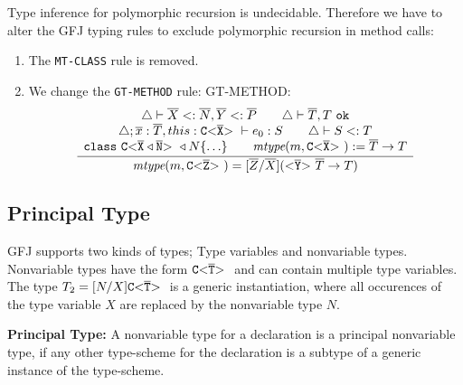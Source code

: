 \documentclass[acmsmall,screen,review]{acmart}
\begin{document}
Type inference for polymorphic recursion is undecidable.
Therefore we have to alter the GFJ typing rules to exclude polymorphic recursion in method calls:
\begin{enumerate}
    \item The \texttt{MT-CLASS} rule is removed.
    \item We change the \texttt{GT-METHOD} rule:
GT-METHOD:
\begin{align*}
\frac{\displaystyle \begin{array}{c}
\triangle \vdash \overline{X} <: \overline{N}, \overline{Y} <: \overline{P}  \quad \quad 
\triangle \vdash \overline{T}, T \ \texttt{ok} \\
\triangle ; \overline{x}:\overline{T}, this : \mathtt{C {\tt <} \overline{X} {\tt >} \ } \vdash e_0 : S \quad \quad
\triangle \vdash S <: T \\
\texttt{class}\ \mathtt{C {\tt <} \overline{X} \triangleleft \overline{N} {\tt >} \ } \triangleleft N \{ \ldots \} \quad \quad
\textit{mtype}(m, \mathtt{C {\tt <} \overline{X} {\tt >} \ }) := \overline{T} \to T \\
\end{array}}{\displaystyle 
\textit{mtype}(m, \mathtt{C {\tt <} \overline{Z} {\tt >} \ }) = [\overline{Z} / \overline{X}](\mathtt{ {\tt <} \overline{Y} {\tt >} \ } \overline{T} \to T)
}
\end{align*}
\end{enumerate}

\subsection{Principal Type}


GFJ supports two kinds of types;
Type variables and nonvariable types.
Nonvariable types have the form $\mathtt{C {\tt <} \overline{T} {\tt >} \ }$ and can contain multiple type variables.
The type $T_2 = [N/X]\mathtt{C {\tt <} \overline{T} {\tt >} \ }$ is a generic instantiation,
where all occurences of the type variable $X$ are replaced by the nonvariable type $N$.

\textbf{Principal Type:}
A nonvariable type for a declaration is a principal nonvariable type,
if any other type-scheme for the declaration is a subtype of a generic instance
of the type-scheme.
\end{document}
